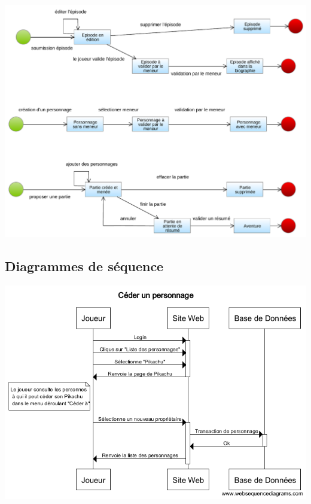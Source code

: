\documentclass[a4paper, 11pt, titlepage]{article}
\begin{document}
\begin{center}
\includegraphics[scale=0.7]{conception/CreationEpisodesPersoParties.pdf}
\end{center}

\subsection{Diagrammes de séquence}

\begin{center}
\includegraphics[scale=0.55]{sequence/CederUnPersonnage.png}
\end{center}
\end{document}
